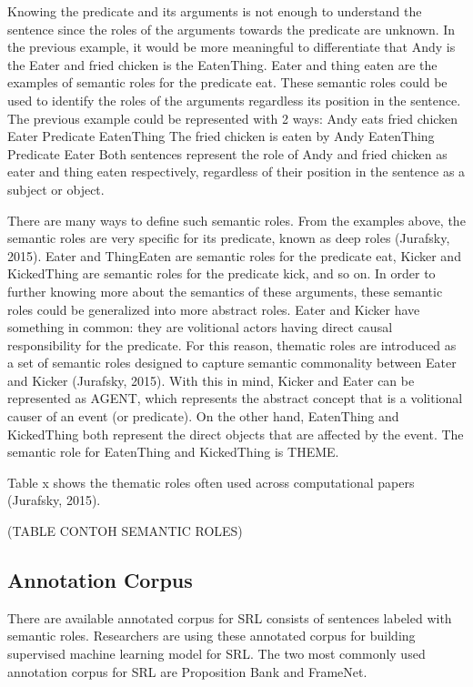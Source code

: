 Knowing the predicate and its arguments is not enough to understand the sentence since the roles of the arguments towards the predicate are unknown. In the previous example, it would be more meaningful to differentiate that Andy is the Eater and fried chicken is the EatenThing. Eater and thing eaten are the examples of semantic roles for the predicate eat. These semantic roles could be used to identify the roles of the arguments regardless its position in the sentence. The previous example could be represented with 2 ways:
Andy         eats      fried chicken
Eater      Predicate      EatenThing
The fried chicken   is eaten    by Andy
EatenThing          Predicate      Eater
Both sentences represent the role of Andy and fried chicken as eater and thing eaten respectively, regardless of their position in the sentence as a subject or object.

There are many ways to define such semantic roles. From the examples above, the semantic roles are very specific for its predicate, known as deep roles (Jurafsky, 2015). Eater and ThingEaten are semantic roles for the predicate eat, Kicker and KickedThing are semantic roles for the predicate kick, and so on. In order to further knowing more about the semantics of these arguments, these semantic roles could be generalized into more abstract roles. Eater and Kicker have something in common: they are volitional actors having direct causal responsibility for the predicate. For this reason, thematic roles are introduced as a set of semantic roles designed to capture semantic commonality between Eater and Kicker (Jurafsky, 2015). With this in mind, Kicker and Eater can be represented as AGENT, which represents the abstract concept that is a volitional causer of an event (or predicate). On the other hand, EatenThing and KickedThing both represent the direct objects that are affected by the event. The semantic role for EatenThing and KickedThing is THEME.

Table x shows the thematic roles often used across computational papers (Jurafsky, 2015).

(TABLE CONTOH SEMANTIC ROLES)


\subsection{Annotation Corpus}
There are available annotated corpus for SRL consists of sentences labeled with semantic roles. Researchers are using these annotated corpus for building supervised machine learning model for SRL. The two most commonly used annotation corpus for SRL are Proposition Bank and FrameNet.


